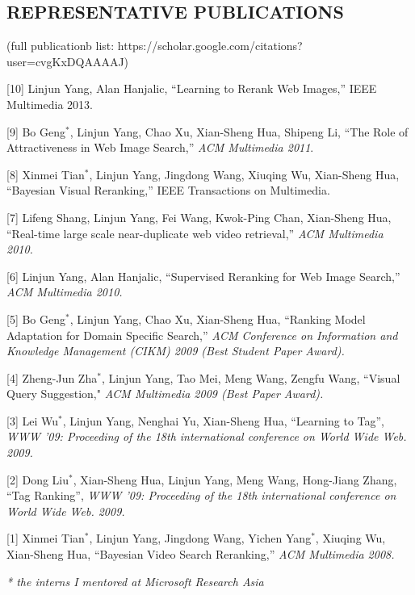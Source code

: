 \documentclass{res}
\begin{document}
\begin{resume}

\section{{REPRESENTATIVE PUBLICATIONS}}
(full publicationb list: https://scholar.google.com/citations?user=cvgKxDQAAAAJ)

[10] Linjun Yang, Alan Hanjalic, ``Learning to Rerank Web Images,'' IEEE Multimedia 2013.

[9] Bo Geng$^*$, Linjun Yang, Chao Xu, Xian-Sheng Hua, Shipeng Li, ``The Role of Attractiveness in Web Image Search,'' {\it ACM Multimedia 2011}.

[8] Xinmei Tian$^*$, Linjun Yang, Jingdong Wang, Xiuqing Wu, Xian-Sheng Hua, ``Bayesian Visual Reranking,'' IEEE Transactions on Multimedia.

[7] Lifeng Shang, Linjun Yang, Fei Wang, Kwok-Ping Chan, Xian-Sheng Hua, ``Real-time large scale near-duplicate web video retrieval,'' {\it ACM Multimedia 2010.}

[6] Linjun Yang, Alan Hanjalic, ``Supervised Reranking for Web Image Search,'' {\it ACM Multimedia 2010.}

[5] Bo Geng$^*$, Linjun Yang, Chao Xu, Xian-Sheng Hua, ``Ranking Model Adaptation for Domain Specific Search,'' {\it ACM Conference on Information and Knowledge Management (CIKM) 2009 (Best Student Paper Award).}

[4] Zheng-Jun Zha$^*$, Linjun Yang, Tao Mei, Meng Wang, Zengfu Wang, ``Visual Query Suggestion," {\it ACM Multimedia 2009 (Best Paper Award).}


[3] Lei Wu$^*$, Linjun Yang, Nenghai Yu, Xian-Sheng Hua, ``Learning to
Tag'', {\it WWW '09: Proceeding of the 18th international conference
on World Wide Web. 2009.}

[2] Dong Liu$^*$, Xian-Sheng Hua, Linjun Yang, Meng Wang, Hong-Jiang
Zhang, ``Tag Ranking'', {\it WWW '09: Proceeding of the 18th
international conference on World Wide Web. 2009.}


[1] Xinmei Tian$^*$, Linjun Yang, Jingdong Wang, Yichen Yang$^*$,
Xiuqing Wu, Xian-Sheng Hua, ``Bayesian Video Search Reranking,''
{\it ACM Multimedia 2008.}

\vspace{-0.1in} \emph{* the interns I mentored at Microsoft Research
Asia}




\end{resume}
\end{document}
